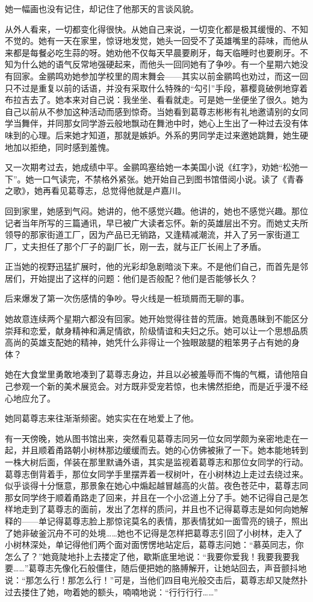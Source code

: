 \par 她一幅画也没有记住，却记住了他那天的言谈风貌。
\par 从外人看来，一切都变化得很快。从她自己来说，一切变化都是极其缓慢的、不知不觉的。她有一天在家里，惊讶地发觉，她头一回受不了英雄嘴里的蒜味，而他从来都是每餐必吃生蒜的呀。她劝他不仅每天早晨要刷牙，每天临睡时也要刷牙。不知为什么她的语气反常地强硬起来，而他头一回同她有了争吵。有一个星期六她没有回家。金鹂鸣劝她参加学校里的周末舞会——其实以前金鹂鸣也劝过，而这一回只不过是重复以前的话语，并没有采取什么特殊的“勾引”手段，慕樱竟破例地穿着布拉吉去了。她本来对自己说：我坐坐、看看就走。可是她一坐便坐了很久。她为自己以前从不参加这种活动而感到惊奇。当她看到葛尊志彬彬有礼地邀请别的女同学当舞伴，并同那女同学游云般地飘动在舞池中时，她心上生出了一种过去没有体味到的心理。后来她才知道，那就是嫉妒。外系的男同学走过来邀她跳舞，她生硬地加以拒绝，同时感到羞愧。
\par 又一次期考过去，她成绩中平。金鹂鸣塞给她一本美国小说《红字》，劝她“松弛一下”。她一口气读完，不禁格外紧张。她开始自己到图书馆借阅小说。读了《青春之歌》，她再看见葛尊志，总觉得他就是卢嘉川。
\par 回到家里，她感到气闷。她讲的，他不感觉兴趣。他讲的，她也不感觉兴趣。那位记者当年所写的三篇通讯，早已被广大读者忘怀。新的英雄层出不穷。而她丈夫所领导的那家街道工厂，因为产品已无销路，又逢精减潮流，并入了另一家街道工厂，丈夫担任了那个厂子的副厂长，刚一去，就与正厂长闹上了矛盾。
\par 正当她的视野迅猛扩展时，他的光彩却急剧暗淡下来。不是他们自己，而首先是邻居们，开始提出了这样的问题：他们是否般配？他们是否能够长久？
\par 后来爆发了第一次伤感情的争吵。导火线是一桩琐屑而无聊的事。
\par 她故意连续两个星期六都没有回家。她开始觉得往昔的荒唐。她竟愚昧到不能区分崇拜和恋爱，献身精神和满足情欲，阶级情谊和夫妇之乐。她可以让一个思想品质高尚的英雄支配她的精神，她凭什么非得让一个独眼跛腿的粗笨男子占有她的身体？
\par 她在大食堂里勇敢地凑到了葛尊志身边，并且以必被羞辱而不悔的气概，请他陪自己参观一个新的美术展览会。对方既非受宠若惊，也未怫然拒绝，而是近乎漫不经心地应允了。
\par 她同葛尊志来往渐渐频密。她实实在在地爱上了他。
\par 有一天傍晚，她从图书馆出来，突然看见葛尊志同另一位女同学颇为亲密地走在一起，并且顺着甬路朝小树林那边缓缓而去。她的心仿佛被揪了一下。她本能地转到一株大树后面，佯装在那里默诵外语，其实是监视着葛尊志和那位女同学的行动。葛尊志倒背着手，那位女同学手里摆弄着一杈树叶，在小树林边上走过去绕过来。似乎谈得十分惬意，那景象在她心中煽起越冒越高的火苗。夜色苍茫中，葛尊志同那女同学终于顺着甬路走了回来，并且在一个小岔道上分了手。她不记得自己是怎样地走到了葛尊志的面前，发出了怎样的质问，并且也不记得葛尊志是如何向她解释的——单记得葛尊志脸上那惊诧莫名的表情，那表情犹如一面雪亮的镜子，照出了她非破釜沉舟不可的处境……她也不记得是怎样把葛尊志引回了小树林，走入了小树林深处，单记得他们两个面对面愣愣地站定后，葛尊志问她：“慕英同志，你怎么了？”她竟陡地扑上去搂定了他，歇斯底里地说：“我要你爱我！我要我要我要……”葛尊志先像化石般僵住，随后便把她的胳膊解开，让她站回去，声音颤抖地说：“那怎么行！那怎么行！”可是，当他们四目电光般交击后，葛尊志却又陡然扑过去搂住了她，吻着她的额头，喃喃地说：“行行行行……”
